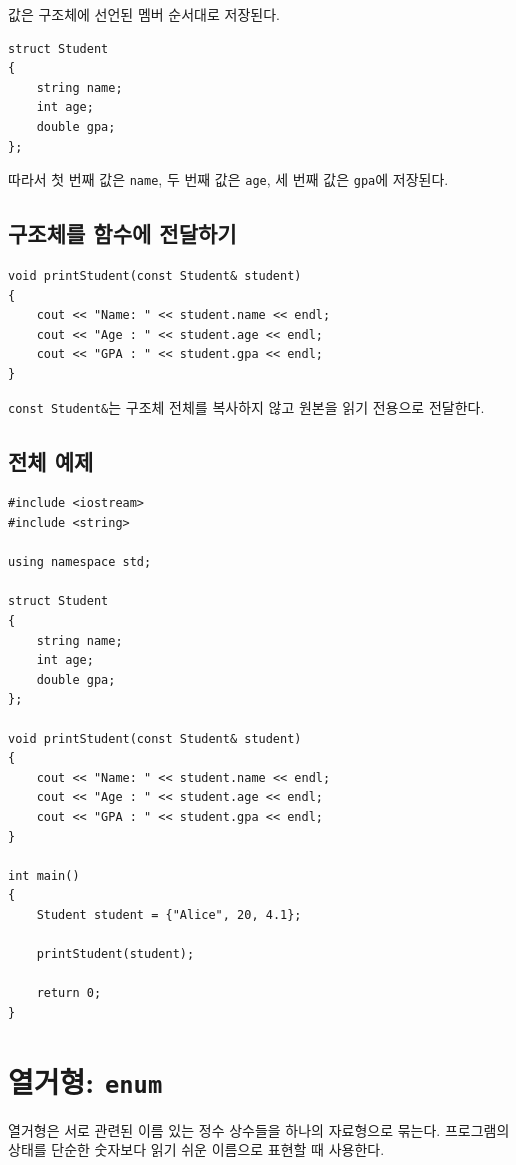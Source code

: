 \documentclass[11pt,a4paper]{article}
\begin{document}
값은 구조체에 선언된 멤버 순서대로 저장된다.

\begin{lstlisting}
struct Student
{
    string name;
    int age;
    double gpa;
};
\end{lstlisting}

따라서 첫 번째 값은 \texttt{name}, 두 번째 값은 \texttt{age}, 세 번째 값은 \texttt{gpa}에 저장된다.

\subsection{구조체를 함수에 전달하기}

\begin{lstlisting}
void printStudent(const Student& student)
{
    cout << "Name: " << student.name << endl;
    cout << "Age : " << student.age << endl;
    cout << "GPA : " << student.gpa << endl;
}
\end{lstlisting}

\texttt{const Student\&}는 구조체 전체를 복사하지 않고 원본을 읽기 전용으로 전달한다.

\subsection{전체 예제}

\begin{lstlisting}
#include <iostream>
#include <string>

using namespace std;

struct Student
{
    string name;
    int age;
    double gpa;
};

void printStudent(const Student& student)
{
    cout << "Name: " << student.name << endl;
    cout << "Age : " << student.age << endl;
    cout << "GPA : " << student.gpa << endl;
}

int main()
{
    Student student = {"Alice", 20, 4.1};

    printStudent(student);

    return 0;
}
\end{lstlisting}

\section{열거형: \texttt{enum}}

열거형은 서로 관련된 이름 있는 정수 상수들을 하나의 자료형으로 묶는다.
프로그램의 상태를 단순한 숫자보다 읽기 쉬운 이름으로 표현할 때 사용한다.
\end{document}
